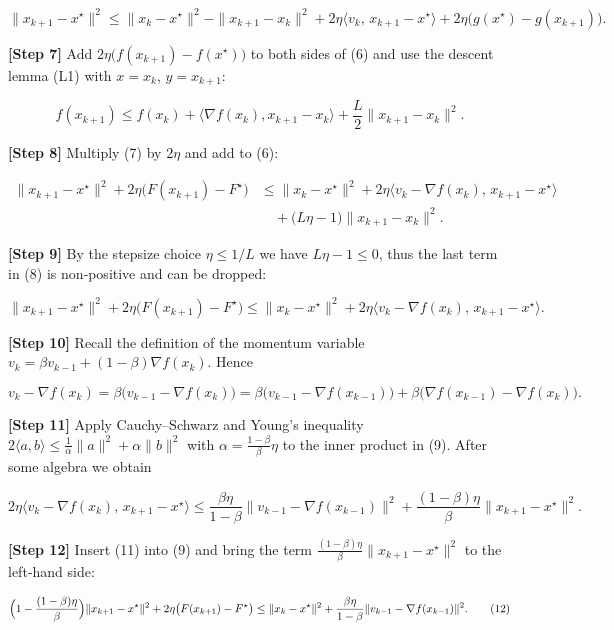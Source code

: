 \documentclass{article}
\begin{document}
\[
\|x_{k+1}-x^\star\|^{2}
\le \|x_k-x^\star\|^{2}
      -\|x_{k+1}-x_k\|^{2}
      +2\eta\langle v_k,\,x_{k+1}-x^\star\rangle
      +2\eta\bigl(g(x^\star)-g(x_{k+1})\bigr).
\tag{6}
\]

\noindent\textbf{[Step 7]}  Add $2\eta\bigl(f(x_{k+1})-f(x^\star)\bigr)$ to both sides of (6) and use the descent lemma (L1) with $x=x_k$, $y=x_{k+1}$:

\[
f(x_{k+1})\le f(x_k)+\langle \nabla f(x_k),x_{k+1}-x_k\rangle
               +\frac{L}{2}\|x_{k+1}-x_k\|^{2}.
\tag{7}
\]

\noindent\textbf{[Step 8]}  Multiply (7) by $2\eta$ and add to (6):

\[
\begin{aligned}
\|x_{k+1}-x^\star\|^{2}+2\eta\bigl(F(x_{k+1})-F^\star\bigr)
&\le \|x_k-x^\star\|^{2}
   +2\eta\langle v_k-\nabla f(x_k),\,x_{k+1}-x^\star\rangle  \\
&\quad +\bigl(L\eta-1\bigr)\|x_{k+1}-x_k\|^{2}.
\end{aligned}
\tag{8}
\]

\noindent\textbf{[Step 9]}  By the stepsize choice $\eta\le 1/L$ we have $L\eta-1\le0$, thus the last term in (8) is non‑positive and can be dropped:

\[
\|x_{k+1}-x^\star\|^{2}+2\eta\bigl(F(x_{k+1})-F^\star\bigr)
\le \|x_k-x^\star\|^{2}
   +2\eta\langle v_k-\nabla f(x_k),\,x_{k+1}-x^\star\rangle .
\tag{9}
\]

\noindent\textbf{[Step 10]}  Recall the definition of the momentum variable
$v_k=\beta v_{k-1}+(1-\beta)\nabla f(x_k)$.  Hence

\[
v_k-\nabla f(x_k)=\beta\bigl(v_{k-1}-\nabla f(x_k)\bigr)
                =\beta\bigl(v_{k-1}-\nabla f(x_{k-1})\bigr)
                  +\beta\bigl(\nabla f(x_{k-1})-\nabla f(x_k)\bigr).
\tag{10}
\]

\noindent\textbf{[Step 11]}  Apply Cauchy–Schwarz and Young’s inequality
$2\langle a,b\rangle\le \frac{1}{\alpha}\|a\|^{2}+\alpha\|b\|^{2}$ with
$\alpha=\frac{1-\beta}{\beta}\eta$ to the inner product in (9).  After some algebra we obtain

\[
2\eta\langle v_k-\nabla f(x_k),\,x_{k+1}-x^\star\rangle
\le
\frac{\beta\eta}{1-\beta}\|v_{k-1}-\nabla f(x_{k-1})\|^{2}
+\frac{(1-\beta)\eta}{\beta}\|x_{k+1}-x^\star\|^{2}.
\tag{11}
\]

\noindent\textbf{[Step 12]}  Insert (11) into (9) and bring the term
$\frac{(1-\beta)\eta}{\beta}\|x_{k+1}-x^\star\|^{2}$ to the left‑hand side:

\[
\Bigl(1-\frac{(1-\beta)\eta}{\beta}\Bigr)\|x_{k+1}-x^\star\|^{2}
   +2\eta\bigl(F(x_{k+1})-F^\star\bigr)
\le \|x_k-x^\star\|^{2}
   +\frac{\beta\eta}{1-\beta}\|v_{k-1}-\nabla f(x_{k-1})\|^{2}.
\tag{12}
\]
\end{document}
